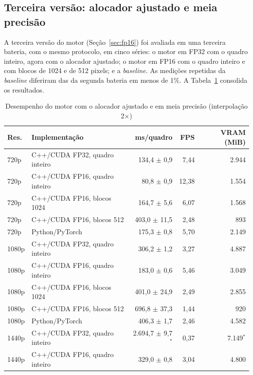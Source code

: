 \documentclass[
    12pt,                %
    openright,           %
    oneside,             %
    a4paper,             %
    english,             %
    brazil               %
]{abntex2}
\begin{document}
\subsection{Terceira versão: alocador ajustado e meia precisão}
\label{sec:res_fp16}

A terceira versão do motor (Seção~\ref{sec:fp16}) foi avaliada em uma terceira bateria, com o mesmo protocolo, em cinco séries: o motor em FP32 com o quadro inteiro, agora com o alocador ajustado; o motor em FP16 com o quadro inteiro e com blocos de 1024 e de 512 pixels; e a \textit{baseline}. As medições repetidas da \textit{baseline} diferiram das da segunda bateria em menos de 1\%. A Tabela~\ref{tab:resultados_fp16} consolida os resultados.

\begin{table}[H]
\centering
\caption{Desempenho do motor com o alocador ajustado e em meia precisão (interpolação 2$\times$)}
\label{tab:resultados_fp16}
\footnotesize
\begin{tabular}{llrrr}
\toprule
\textbf{Res.} & \textbf{Implementação} & \textbf{ms/quadro} & \textbf{FPS} & \textbf{VRAM (MiB)} \\
\midrule
720p & C++/CUDA FP32, quadro inteiro & 134,4 $\pm$ 0,9 & 7,44 & 2.944 \\
720p & C++/CUDA FP16, quadro inteiro & 80,8 $\pm$ 0,9 & 12,38 & 1.554 \\
720p & C++/CUDA FP16, blocos 1024 & 164,7 $\pm$ 5,6 & 6,07 & 1.568 \\
720p & C++/CUDA FP16, blocos 512 & 403,0 $\pm$ 11,5 & 2,48 & 893 \\
720p & Python/PyTorch & 175,3 $\pm$ 0,8 & 5,70 & 2.149 \\
\midrule
1080p & C++/CUDA FP32, quadro inteiro & 306,2 $\pm$ 1,2 & 3,27 & 4.887 \\
1080p & C++/CUDA FP16, quadro inteiro & 183,0 $\pm$ 0,6 & 5,46 & 3.049 \\
1080p & C++/CUDA FP16, blocos 1024 & 401,0 $\pm$ 24,9 & 2,49 & 2.855 \\
1080p & C++/CUDA FP16, blocos 512 & 696,8 $\pm$ 37,3 & 1,44 & 920 \\
1080p & Python/PyTorch & 406,3 $\pm$ 1,7 & 2,46 & 4.582 \\
\midrule
1440p & C++/CUDA FP32, quadro inteiro & 2.694,7 $\pm$ 9,7$^{*}$ & 0,37 & 7.149$^{*}$ \\
1440p & C++/CUDA FP16, quadro inteiro & 329,0 $\pm$ 0,8 & 3,04 & 4.800 \\

\end{tabular}
\end{table}
\end{document}
